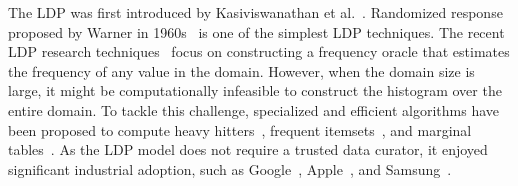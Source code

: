 The \textsf{LDP} was first introduced by Kasiviswanathan et al.~\cite{Kasivi}. Randomized response proposed by Warner in 1960s~\cite{RR} is one of the simplest \textsf{LDP} techniques. The recent \textsf{LDP} research techniques~\cite{LDP1, LDP2, Rappor1} focus on constructing a frequency oracle that estimates the frequency of any value in the domain. However, when the domain size is large, it might be computationally infeasible to construct the histogram over the entire domain. To tackle this challenge, specialized and efficient algorithms have been proposed to compute heavy hitters~\cite{HH,Rappor2,HH2}, frequent itemsets~\cite{15,itemset}, and marginal tables~\cite{Cormode, CALM}. As the \textsf{LDP} model does not require a trusted data curator, it enjoyed significant industrial adoption, such as Google~\cite{Rappor1, Rappor2}, Apple~\cite{Apple}, and Samsung~\cite{Samsung}.



